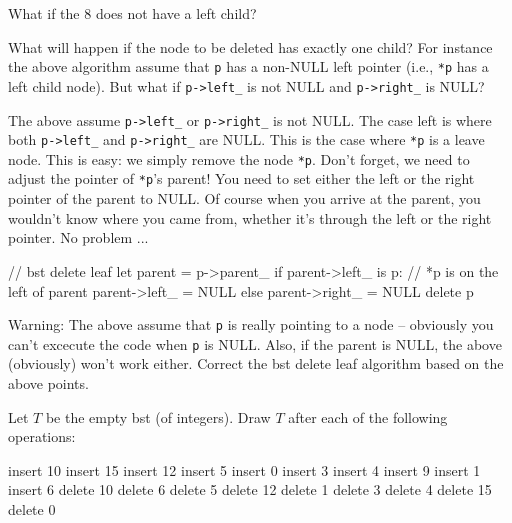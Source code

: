 \begin{ex}
What if the 8 does not have a left child?
\end{ex}


\begin{ex}
  What will happen if the node to be deleted has exactly one child?
  For instance the above algorithm assume that \verb!p!
  has a non-NULL left pointer (i.e., \verb!*p! has a left child node).
  But what if \verb!p->left_! is not NULL and
  \verb!p->right_! is NULL?
\end{ex}


The above assume \verb!p->left_! or
\verb!p->right_! is not NULL.
The case left is where both \verb!p->left_!
and \verb!p->right_! are NULL.
This is the case where \verb!*p! is a leave node.
This is easy: we simply remove the node \verb!*p!.
Don't forget, we need to adjust the pointer of \verb!*p!'s parent!
You need to set either the left or the right pointer of
the parent to NULL.
Of course when you arrive at the parent, you wouldn't know
where you came from, whether it's through the left or the right pointer.
No problem ...
\begin{console}
// bst delete leaf
let parent = p->parent_
if parent->left_ is p: // *p is on the left of parent
    parent->left_ = NULL
else
    parent->right_ = NULL
delete p
\end{console}


\begin{ex}
  \begin{tightlist}
    \li Warning: The above assume that \verb!p! is really pointing to a
    node -- obviously you can't excecute the code when \verb!p! is
    NULL.
    \li Also, if the parent is NULL, the above (obviously) won't work either.
    \li Correct the bst delete leaf algorithm based on the above
    points.
  \end{tightlist}
\end{ex}



\begin{ex}
  Let $T$ be the empty bst (of integers).
  Draw $T$ after each of the following operations:
  \begin{tightlist}
    \li insert 10
    \li insert 15
    \li insert 12
    \li insert 5
    \li insert 0
    \li insert 3
    \li insert 4
    \li insert 9
    \li insert 1
    \li insert 6
    \li delete 10
    \li delete 6
    \li delete 5
    \li delete 12
    \li delete 1
    \li delete 3
    \li delete 4
    \li delete 15
    \li delete 0
  \end{tightlist}
\end{ex}


